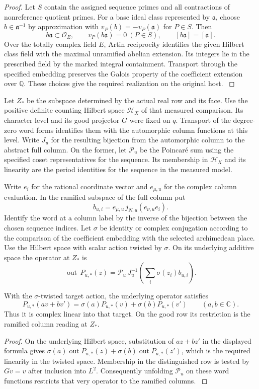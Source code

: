 \begin{proof}
Let \(S\) contain the assigned sequence primes and all contractions
of nonreference quotient primes. For a base ideal class represented
by \(\mathfrak a\), choose \(b\in\mathfrak a^{-1}\) by approximation
with \(v_P(b)=-v_P(\mathfrak a)\) for \(P\in S\). Then
\[
 b\mathfrak a\subset\mathcal O_E,\qquad
 v_P(b\mathfrak a)=0\ (P\in S),\qquad [b\mathfrak a]=[\mathfrak a].
\]
Over the totally complex field \(E\), Artin reciprocity
identifies the given Hilbert class field with the maximal unramified
abelian extension. Its integers lie in the prescribed field by the
marked integral containment. Transport through the specified
embedding preserves the Galois property of the coefficient extension
over \(\mathbb Q\). These choices give the required realization on
the original host. \label{cor:automorphic-realization-70}
\end{proof}

Let \(Z_*\) be the subspace determined by the actual real row and
its face. Use the positive definite counting Hilbert space
\(\mathcal H_X\) of that measured comparison. Its character
level and its good projector \(G\) were fixed on \(q\).
Transport of the degree-zero word forms identifies them with the
automorphic column functions at this level. Write \(J_u\) for
the resulting bijection from the automorphic column to the
abstract full column. On the former, let \(\mathcal P_u\) be
the Poincar\'e sum using the specified coset representatives for the sequence.
Its membership in \(\mathcal H_X\) and its linearity are the
period identities for the sequence in the measured model.

Write \(e_i\) for the rational coordinate vector and
\(e_{\mu,u}\) for the complex column evaluation.
In the ramified
subspace of the full column put
\[
       b_{u,i}=e_{\mu,u}\,j_{N,u}(e_{\nu,u}e_i).
\]
Identify the word
at a column label by the inverse of the bijection between the chosen sequence indices.
Let \(\sigma\) be identity or complex conjugation according to
the comparison of the coefficient embedding with the selected
archimedean place. Use the Hilbert space with scalar action
twisted by \(\sigma\). On its underlying additive space the
operator at \(Z_*\) is
\[
   \operatorname{out}\,P_{u,*}(z)
     =\mathcal P_u\,J_u^{-1}
        \left(\sum_i\sigma(z_i)b_{u,i}\right).
\]
\begin{lemma}
With the \(\sigma\)-twisted target action, the underlying operator satisfies
\[
 P_{u,*}(av+bv')=\sigma(a)P_{u,*}(v)+\sigma(b)P_{u,*}(v')\qquad(a,b\in\mathbb C).
\]
Thus it is complex linear into that target. On the good row its restriction is the ramified column reading at \(Z_*\).
\end{lemma}
\begin{proof}
On the underlying Hilbert space, substitution of \(az+bz'\) in
the displayed formula gives \(\sigma(a)\operatorname{out}P_{u,*}(z)
+\sigma(b)\operatorname{out}P_{u,*}(z')\), which is the required
linearity in the twisted space. Membership in the distinguished
row is tested by \(Gv=v\) after inclusion into \(L^2\).
Consequently unfolding \(\mathcal P_u\) on these word functions
restricts that very operator to the ramified columns.
\label{cor:automorphic-realization-71}
\end{proof}

